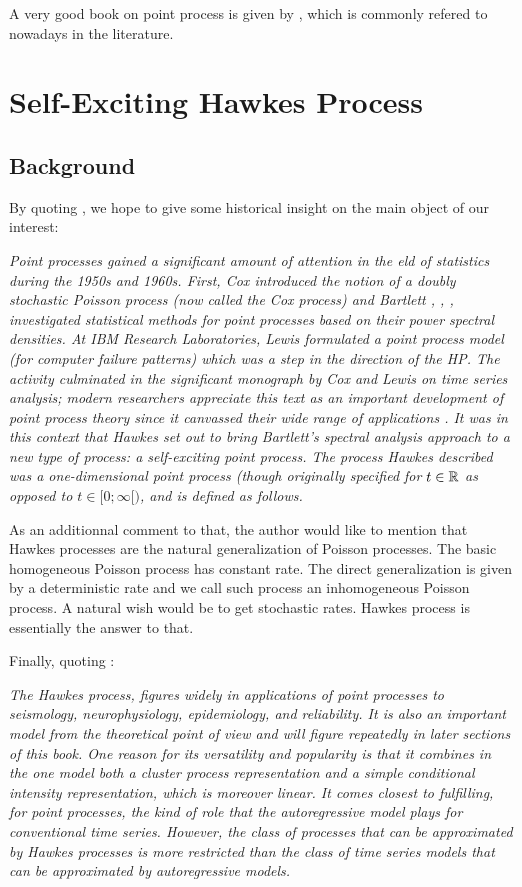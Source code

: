 \documentclass[11pt]{book}
\begin{document}
A very good book on point process is given by \cite{daley}, which is commonly refered to nowadays in the literature.

\chapter{Self-Exciting Hawkes Process}
\section{Background}
By quoting \cite{simullaub}, we hope to give some historical insight on the main object of our interest:

\textit{Point processes gained a significant amount of attention in the eld of statistics during the 1950s and 1960s. First, Cox \cite{hphistorique1} introduced the notion of a doubly stochastic Poisson process (now called the Cox process) and Bartlett \cite{hphistorique2}, \cite{hphistorique3}, \cite{hphistorique4}, investigated statistical methods for point processes based on their power spectral densities. At IBM Research Laboratories, Lewis \cite{hphistorique5} formulated a point process model (for computer failure patterns) which was a step in the direction of the HP. The activity culminated in the significant monograph by Cox and Lewis \cite{hphistorique6} on time series analysis; modern researchers appreciate this text as an important development of point process theory since it canvassed their wide range of applications \cite{Hawkes}. It was in this context that Hawkes \cite{Hawkes} set out to bring Bartlett's spectral analysis approach to a new type of process: a self-exciting point process. The process Hawkes described was a one-dimensional point process (though originally specified for $t \in \mathbb{R}$ as opposed to $t \in [0;\infty[)$, and is defined as follows.}

As an additionnal comment to that, the author would like to mention that Hawkes processes are the natural generalization of Poisson processes. The basic homogeneous Poisson process has constant rate. The direct generalization is given by a deterministic rate and we call such process an inhomogeneous Poisson process. A natural wish would be to get stochastic rates. Hawkes process is essentially the answer to that.

Finally, quoting \cite{daley}:

\textit{The Hawkes process, figures widely in applications of point processes to seismology, neurophysiology, epidemiology, and reliability. It is also an important model from the theoretical point of view and will figure repeatedly in later sections of this book. One reason for its versatility and popularity is that it combines in the one model both a cluster process representation and a simple conditional intensity representation, which is moreover linear. It comes closest to fulfilling, for point processes, the kind of role that the autoregressive model plays for conventional time series. However, the class of processes that can be approximated by Hawkes processes is more restricted than the class of time series models that can be approximated by autoregressive models. }
\end{document}
